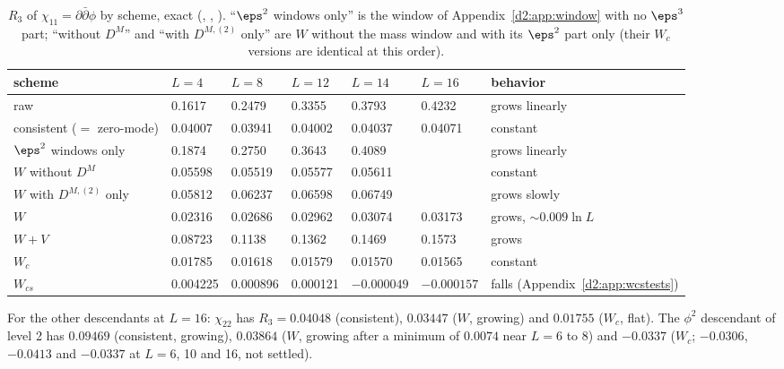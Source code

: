\begin{table}[ht]
\centering\footnotesize\renewcommand{\arraystretch}{1.15}
\begin{tabular}{@{}lllllll@{}}
\toprule
scheme & $L=4$ & $L=8$ & $L=12$ & $L=14$ & $L=16$ & behavior \\\midrule
raw & 0.1617 & 0.2479 & 0.3355 & 0.3793 & 0.4232 & grows linearly \\
consistent ($=$ zero-mode) & 0.04007 & 0.03941 & 0.04002 & 0.04037 & 0.04071 & constant \\
$\eps^2$ windows only & 0.1874 & 0.2750 & 0.3643 & 0.4089 & & grows linearly \\
$W$ without $D^M$ & 0.05598 & 0.05519 & 0.05577 & 0.05611 & & constant \\
$W$ with $D^{M,(2)}$ only & 0.05812 & 0.06237 & 0.06598 & 0.06749 & & grows slowly \\
$W$ & 0.02316 & 0.02686 & 0.02962 & 0.03074 & 0.03173 & grows, ${\sim}0.009\ln L$ \\
$W{+}V$ & 0.08723 & 0.1138 & 0.1362 & 0.1469 & 0.1573 & grows \\
$W_c$ & 0.01785 & 0.01618 & 0.01579 & 0.01570 & 0.01565 & constant \\
$W_{cs}$ & 0.004225 & 0.000896 & 0.000121 & $-0.000049$ & $-0.000157$ & falls (Appendix~\ref{d2:app:wcstests}) \\
\bottomrule
\end{tabular}
\caption{$R_3$ of $\chi_{11}=\partial\bar\partial\phi$ by scheme, exact (,
, ).
``$\eps^2$ windows only'' is the window of Appendix~\ref{d2:app:window} with no $\eps^3$ part; ``without $D^M$'' and ``with
$D^{M,(2)}$ only'' are $W$ without the mass window and with its $\eps^2$ part only (their $W_c$ versions are identical at this
order).}
\label{d2:tab:desc3}
\end{table}

For the other descendants at $L=16$: $\chi_{22}$ has $R_3=0.04048$ (consistent), $0.03447$ ($W$, growing) and $0.01755$
($W_c$, flat). The $\phi^2$ descendant of level 2 has $0.09469$ (consistent, growing), $0.03864$ ($W$, growing after a minimum of
$0.0074$ near $L=6$ to 8) and $-0.0337$ ($W_c$; $-0.0306$, $-0.0413$ and $-0.0337$ at $L=6$, 10 and 16, not settled).

